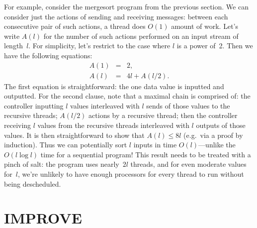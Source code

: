 For example, consider the mergesort program from the previous section.  We can
consider just the actions of sending and receiving messages: between each
consecutive pair of such actions, a thread does $O(1)$ amount of work.  Let's
write $A(l)$ for the number of such actions performed on an input stream of
length~$l$.  For simplicity, let's restrict to the case where $l$ is a power
of~2.  Then we have the following equations:
%
\begin{eqnarray*}
A(1) & = & 2, \\
A(l) & = & 4l+A(l/2).
\end{eqnarray*}
%
The first equation is straightforward: the one data value is inputted and
outputted.  For the second clause, note that a maximal chain is comprised of:
the controller inputting $l$ values interleaved with $l$ sends of those values
to the recursive threads; $A(l/2)$ actions by a recursive thread; then the
controller receiving $l$ values from the recursive threads interleaved with
$l$ outputs of those values.  It is then straightforward to show that $A(l)
\le 8l$ (e.g.~via a proof by induction).  Thus we can potentially sort $l$
inputs in time $O(l)$---unlike the $O(l \log l)$ time for a sequential
program!  This result needs to be treated with a pinch of salt: the
program uses nearly~$2l$ threads, and for even moderate values for~$l$, we're
unlikely to have enough processors for every thread to run without being
descheduled. 

 



\section{IMPROVE}






